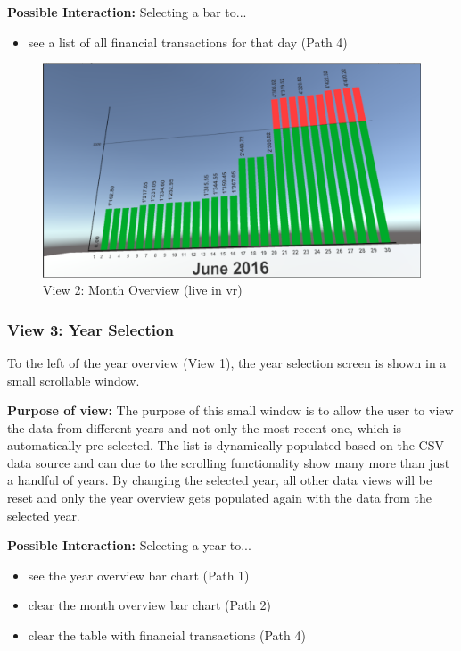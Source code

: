 \textbf{Possible Interaction:} Selecting a bar to...
\begin{itemize}[noitemsep,nolistsep]
	\item see a list of all financial transactions for that day (Path 4)
\end{itemize}

\begin{figure}[h]
	\begin{center}
		\includegraphics[width=12cm]{03_Figures/08_Development/View2_MonthOverview.png}
		\caption{View 2: Month Overview (live in \gls{vr})}
		\label{fig:unityview2}
	\end{center}
\end{figure}


\subsubsection{View 3: Year Selection}

To the left of the year overview (View 1), the year selection screen is shown in a small scrollable window. 

\textbf{Purpose of view:} The purpose of this small window is to allow the user to view the data from different years and not only the most recent one, which is automatically pre-selected. The list is dynamically populated based on the CSV data source and can due to the scrolling functionality show many more than just a handful of years. By changing the selected year, all other data views will be reset and only the year overview gets populated again with the data from the selected year.

\textbf{Possible Interaction:} Selecting a year to...
\begin{itemize}[noitemsep,nolistsep]
	\item see the year overview bar chart (Path 1)
	\item clear the month overview bar chart (Path 2)
	\item clear the table with financial transactions (Path 4)
\end{itemize}

